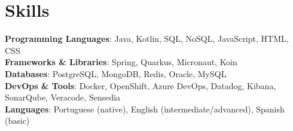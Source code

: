 \section{Skills}
\begin{itemize}[leftmargin=0.15in, label={}]
  \small{\item{
    \textbf{Programming Languages}{: Java, Kotlin, SQL, NoSQL, JavaScript, HTML, CSS} \\
    \textbf{Frameworks \& Libraries}{: Spring, Quarkus, Micronaut, Koin} \\
    \textbf{Databases}{: PostgreSQL, MongoDB, Redis, Oracle, MySQL} \\
    \textbf{DevOps \& Tools}{: Docker, OpenShift, Azure DevOps, Datadog, Kibana, SonarQube, Veracode, Sensedia} \\
    \textbf{Languages}{: Portuguese (native), English (intermediate/advanced), Spanish (basic)} \\
  }}
\end{itemize}
